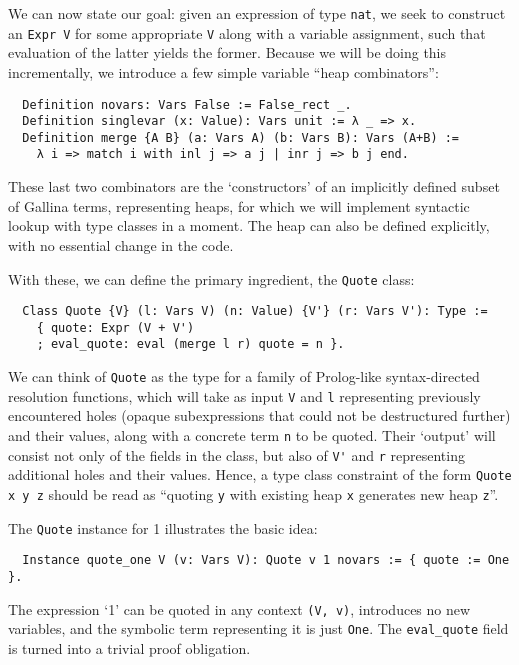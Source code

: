 \documentclass[a4paper,10pt,runningheads]{llncs}
\begin{document}

We can now state our goal: given an expression of type \lstinline|nat|, we seek to construct an \lstinline|Expr V| for some appropriate \lstinline|V| along with a variable assignment, such that evaluation of the latter yields the former. Because we will be doing this incrementally, we introduce a few simple variable ``heap combinators'':
\begin{lstlisting}
  Definition novars: Vars False := False_rect _.
  Definition singlevar (x: Value): Vars unit := λ _ => x.
  Definition merge {A B} (a: Vars A) (b: Vars B): Vars (A+B) :=
    λ i => match i with inl j => a j | inr j => b j end.
\end{lstlisting}
These last two combinators are the `constructors' of an implicitly defined subset of Gallina terms, representing heaps, for which we will implement syntactic lookup with type classes in a moment. The heap can also be defined explicitly, with no essential change in the code.

With these, we can define the primary ingredient, the \lstinline|Quote| class:
\begin{lstlisting}
  Class Quote {V} (l: Vars V) (n: Value) {V'} (r: Vars V'): Type :=
    { quote: Expr (V + V')
    ; eval_quote: eval (merge l r) quote = n }.
\end{lstlisting}
We can think of \lstinline|Quote| as the type for a family of Prolog-like syntax-directed resolution functions, which will take as input \lstinline|V| and \lstinline|l| representing previously encountered holes (opaque subexpressions that could not be destructured further) and their values, along with a concrete term \lstinline|n| to be quoted. Their `output' will consist not only of the fields in the class, but also of \lstinline|V'| and \lstinline|r| representing additional holes and their values. Hence, a type class constraint of the form \lstinline|Quote x y z| should be read as ``quoting \lstinline|y| with existing heap \lstinline|x| generates new heap \lstinline|z|''.

The \lstinline|Quote| instance for 1 illustrates the basic idea:
\begin{lstlisting}
  Instance quote_one V (v: Vars V): Quote v 1 novars := { quote := One }.
\end{lstlisting}
The expression `1' can be quoted in any context \lstinline|(V, v)|, introduces no new variables, and the symbolic term representing it is just \lstinline|One|. The \lstinline|eval_quote| field is turned into a trivial proof obligation.
\end{document}
